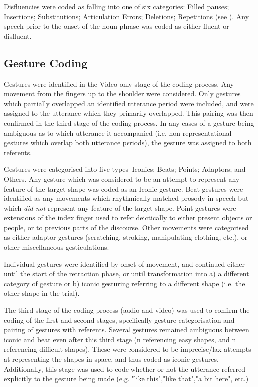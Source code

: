 \documentclass[a4paper,man,natbib]{apa6}
\begin{document}
Disfluencies were coded as falling into one of six categories: Filled pauses; Insertions; Substitutions; Articulation Errors; Deletions; Repetitions (see \citet{Shriberg1996}).
Any speech prior to the onset of the noun-phrase was coded as either fluent or disfluent.

\subsection{Gesture Coding}
Gestures were identified in the Video-only stage of the coding process.
Any movement from the fingers up to the shoulder were considered. 
Only gestures which partially overlapped an identified utterance period were included, and were assigned to the utterance which they primarily overlapped. 
This pairing was then confirmed in the third stage of the coding process. 
In any cases of a gesture being ambiguous as to which utterance it accompanied (i.e. non-representational gestures which overlap both utterance periods), the gesture was assigned to both referents.

Gestures were categorised into five types: Iconics; Beats; Points; Adaptors; and Others. 
Any gesture which was considered to be an attempt to represent any feature of the target shape was coded as an Iconic gesture.
Beat gestures were identified as any movements which rhythmically matched prosody in speech but which \emph{did not} represent any feature of the target shape.
Point gestures were extensions of the index finger used to refer deictically to either present objects or people, or to previous parts of the discourse.
Other movements were categorised as either adaptor gestures (scratching, stroking, manipulating clothing, etc.), or other miscellaneous gesticulations.

Individual gestures were identified by onset of movement, and continued either until the start of the retraction phase, or until transformation into a) a different category of gesture or b) iconic gesturing referring to a different shape (i.e. the other shape in the trial).

The third stage of the coding process (audio and video) was used to confirm the coding of the first and second stages, specifically gesture categorisation and pairing of gestures with referents.
Several gestures remained ambiguous between iconic and beat even after this third stage (n referencing easy shapes, and n referencing difficult shapes).%
These were considered to be imprecise/lax attempts at representing the shapes in space, and thus coded as iconic gestures.
Additionally, this stage was used to code whether or not the utterance referred explicitly to the gesture being made (e.g. "like this","like that","a bit here", etc.)
\end{document}
